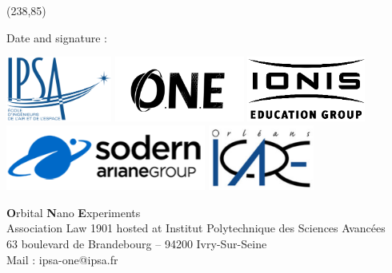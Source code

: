 	\framebox(238,85){\begin{minipage}[]{10cm}
			\begin{center}
				Date and signature :\\
				\vspace{1cm}
				
				
			\end{center}
			
	\end{minipage}}
\vspace{3pt}
\begin{center}
	\includegraphics[height=2.15cm]{media/ipsa} \qquad
	\includegraphics[height=2.15cm]{media/logooneblack}\qquad
	\includegraphics[height=2.15cm]{media/logoionis}\\
	\includegraphics[height=2.15cm]{media/sodern}\qquad
	\includegraphics[height=2.15cm]{media/icare}
\end{center}
		\begin{center}
			\footnotesize
			\textbf{O}rbital \textbf{N}ano \textbf{E}xperiments\\
			Association Law 1901 hosted at Institut Polytechnique des Sciences Avancées\\
			63 boulevard de Brandebourg – 94200 Ivry-Sur-Seine\\
			Mail : ipsa-one@ipsa.fr
		\end{center}
	\newpage
	
